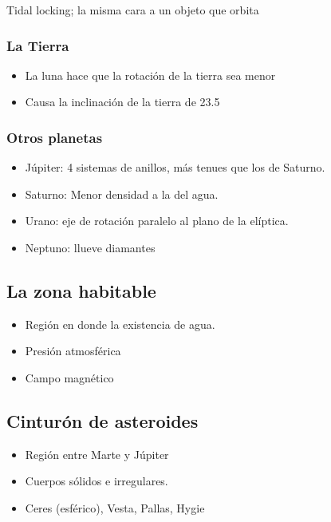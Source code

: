 \documentclass[11pt,fleqn]{book} %
\begin{document}
\begin{remark}
Tidal locking; la misma cara a un objeto que orbita
\end{remark}
\subsubsection{La Tierra}
\begin{itemize}
    \item La luna hace que la rotación de la tierra sea menor 
    \item Causa la inclinación de la tierra de 23.5 
\end{itemize}

\subsubsection{Otros planetas}
\begin{itemize}
    \item Júpiter: 4 sistemas de anillos, más tenues que los de Saturno. 
    \item Saturno: Menor densidad a la del agua. 
    \item Urano: eje de rotación paralelo al plano de la elíptica. 
    \item Neptuno: llueve diamantes
    
    
\end{itemize}

\subsection{La zona habitable}
\begin{itemize}
    \item Región en donde la existencia de agua. 
    \item Presión atmosférica 
    \item Campo magnético 
    
\end{itemize}

\subsection{Cinturón de asteroides}

\begin{itemize}
    \item Región entre Marte y Júpiter
    \item Cuerpos sólidos e irregulares. 
    \item Ceres (esférico), Vesta, Pallas, Hygie
\end{itemize}
\end{document}
